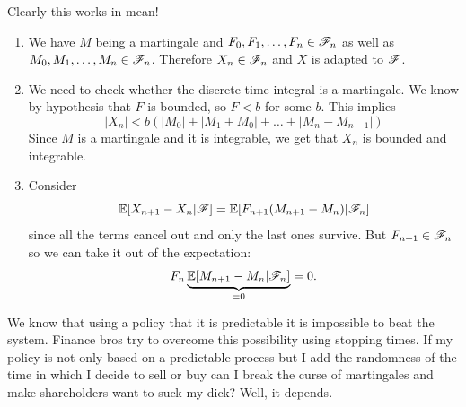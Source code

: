 \documentclass{report}
\begin{document}
Clearly this works in mean! 
\begin{fancyproof}
\begin{enumerate}
	\item	We have $M$ being a martingale and $F_0,F_1,\ldots,F_n\in\mathscr{F}_{n}$ as well as $M_0,M_1,\ldots,M_{n}\in\mathscr{F}_n$. Therefore $X_{n}\in\mathscr{F}_{n}$ and $X$ is adapted to $\mathscr{F}$.
	\item We need to check whether the discrete time integral is a martingale. We know by hypothesis that $F$ is bounded, so $F<b$ for some $b$. This implies
	\begin{equation*}
		|X_{n}|<b(|M_{0}|+|M_1+M_0|+\ldots+|M_n-M_{n-1}|)
 	\end{equation*}
	Since $M$ is a martingale and it is integrable, we get that $X_n$ is bounded and integrable.
	\item Consider
	\begin{equation*}
		\mathbb{E}[X_{n+1}-X_{n}|\mathscr{F}]=\mathbb{E}[F_{n+1}(M_{n+1}-M_{n})|\mathscr{F}_n]
	\end{equation*}
	since all the terms cancel out and only the last ones survive. But $F_{n+1}\in\mathscr{F}_{n}$ so we can take it out of the expectation:
	\[F_{n}\underbrace{\mathbb{E}[M_{n+1}-M_{n}|\mathscr{F}_{n}]}_{=0}=0.\]
\end{enumerate}
\end{fancyproof}
We know that using a policy that it is predictable it is impossible to beat the system. Finance bros try to overcome this possibility using stopping times. If my policy is not only based on a predictable process but I add the randomness of the time in which I decide to sell or buy can I break the curse of martingales and make shareholders want to suck my dick? Well, it depends.
\end{document}
